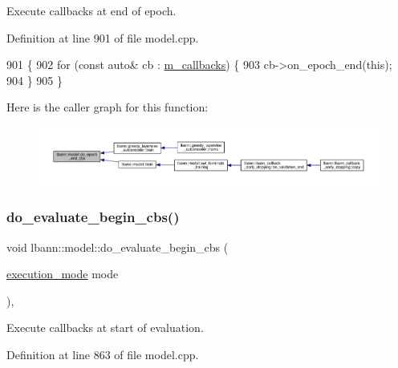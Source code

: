 Execute callbacks at end of epoch. 

Definition at line 901 of file model.\+cpp.


\begin{DoxyCode}
901                              \{
902   \textcolor{keywordflow}{for} (\textcolor{keyword}{const} \textcolor{keyword}{auto}& cb : \hyperlink{classlbann_1_1model_a07b511fef30368494c2ad80922ffd0eb}{m\_callbacks}) \{
903     cb->on\_epoch\_end(\textcolor{keyword}{this});
904   \}
905 \}
\end{DoxyCode}
Here is the caller graph for this function\+:\nopagebreak
\begin{figure}[H]
\begin{center}
\leavevmode
\includegraphics[width=350pt]{classlbann_1_1model_a93e43a6c5aaf8ad890ef50ff97dfa176_icgraph}
\end{center}
\end{figure}
\mbox{\label{classlbann_1_1model_ab14bedea05bd5ef549d95ceb2b57b7a4}} 
\subsubsection{\texorpdfstring{do\+\_\+evaluate\+\_\+begin\+\_\+cbs()}{do\_evaluate\_begin\_cbs()}}
{\footnotesize\ttfamily void lbann\+::model\+::do\+\_\+evaluate\+\_\+begin\+\_\+cbs (\begin{DoxyParamCaption}\item[{\hyperlink{base_8hpp_a2781a159088df64ed7d47cc91c4dc0a8}{execution\+\_\+mode}}]{mode }\end{DoxyParamCaption})\hspace{0.3cm}{\ttfamily [protected]}, {\ttfamily [virtual]}}

Execute callbacks at start of evaluation. 

Definition at line 863 of file model.\+cpp.


